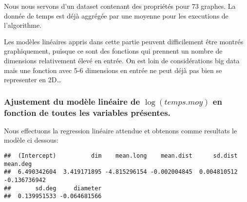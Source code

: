 \documentclass[
]{article}
\newenvironment{Shaded}{\begin{snugshade}}{\end{snugshade}}
\newcommand{\DataTypeTok}[1]{\textcolor[rgb]{0.13,0.29,0.53}{#1}}
\newcommand{\KeywordTok}[1]{\textcolor[rgb]{0.13,0.29,0.53}{\textbf{#1}}}
\newcommand{\NormalTok}[1]{#1}
\newcommand{\OperatorTok}[1]{\textcolor[rgb]{0.81,0.36,0.00}{\textbf{#1}}}
\newcommand{\OtherTok}[1]{\textcolor[rgb]{0.56,0.35,0.01}{#1}}
\newcommand{\StringTok}[1]{\textcolor[rgb]{0.31,0.60,0.02}{#1}}
\begin{document}
Nous nous servons d'un dataset contenant des propriétés pour 73 graphes.
La donnée de temps est déjà aggrégée par une moyenne pour les executions
de l'algorithme.

Les modèles linéaires appris dans cette partie peuvent difficilement
être montrés graphiquement, puisque ce sont des fonctions qui prennent
un nombre de dimensions relativement élevé en entrée. On est loin de
considérations big data mais une fonction avec 5-6 dimensions en entrée
ne peut déjà pas bien se representer en 2D\ldots{}

\hypertarget{ajustement-du-moduxe8le-linuxe9aire-de-logtemps.moy-en-fonction-de-toutes-les-variables-pruxe9sentes.}{%
\subsubsection{\texorpdfstring{Ajustement du modèle linéaire de
\(\log(temps.moy)\) en fonction de toutes les variables
présentes.}{Ajustement du modèle linéaire de \textbackslash log(temps.moy) en fonction de toutes les variables présentes.}}\label{ajustement-du-moduxe8le-linuxe9aire-de-logtemps.moy-en-fonction-de-toutes-les-variables-pruxe9sentes.}}

Nous effectuons la regression linéaire attendue et obtenons comme
resultats le modèle ci dessous:

\begin{Shaded}
\end{Shaded}

\begin{verbatim}
##  (Intercept)          dim    mean.long    mean.dist      sd.dist     mean.deg 
##  6.490342604  3.419171895 -4.815296154 -0.002004845  0.004810512 -0.136736942 
##       sd.deg     diameter 
##  0.139951533 -0.064681566
\end{verbatim}
\end{document}
